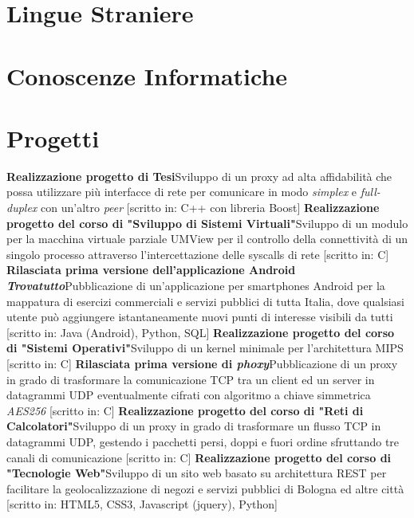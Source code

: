 \documentclass[10pt,a4paper]{moderncv}
\begin{document}
\section{Lingue Straniere}
\section{Conoscenze Informatiche}

\section{Progetti}
 {\textbf{Realizzazione progetto di Tesi}\newline Sviluppo di un proxy ad alta affidabilità che possa utilizzare più interfacce di rete per comunicare in modo {\em simplex} e {\em full-duplex} con un'altro {\em peer} [scritto in: C++ con libreria Boost]}
 {\textbf{Realizzazione progetto del corso di "Sviluppo di Sistemi Virtuali"}\newline Sviluppo di un modulo per la macchina virtuale parziale UMView per il controllo della connettività di un singolo processo attraverso l'intercettazione delle syscalls di rete [scritto in: C]}
 {\textbf{Rilasciata prima versione dell'applicazione Android {\em Trovatutto}}\newline Pubblicazione di un'applicazione per smartphones Android per la mappatura di esercizi commerciali e servizi pubblici di tutta Italia, dove qualsiasi utente può aggiungere istantaneamente nuovi punti di interesse visibili da tutti [scritto in: Java (Android), Python, SQL]}
 {\textbf{Realizzazione progetto del corso di "Sistemi Operativi"}\newline Sviluppo di un kernel minimale per l'architettura MIPS [scritto in: C]}
 {\textbf{Rilasciata prima versione di {\em phoxy}}\newline Pubblicazione di un proxy in grado di trasformare la comunicazione TCP tra un client ed un server in datagrammi UDP eventualmente cifrati con algoritmo a chiave simmetrica {\em AES256} [scritto in: C]} 
 {\textbf{Realizzazione progetto del corso di "Reti di Calcolatori"}\newline Sviluppo di un proxy in grado di trasformare un flusso TCP in datagrammi UDP, gestendo i pacchetti persi, doppi e fuori ordine sfruttando tre canali di comunicazione [scritto in: C]}
 {\textbf{Realizzazione progetto del corso di "Tecnologie Web"}\newline Sviluppo di un sito web basato su architettura REST per facilitare la geolocalizzazione di negozi e servizi pubblici di Bologna ed altre città [scritto in: HTML5, CSS3, Javascript (jquery), Python]}
\end{document}
